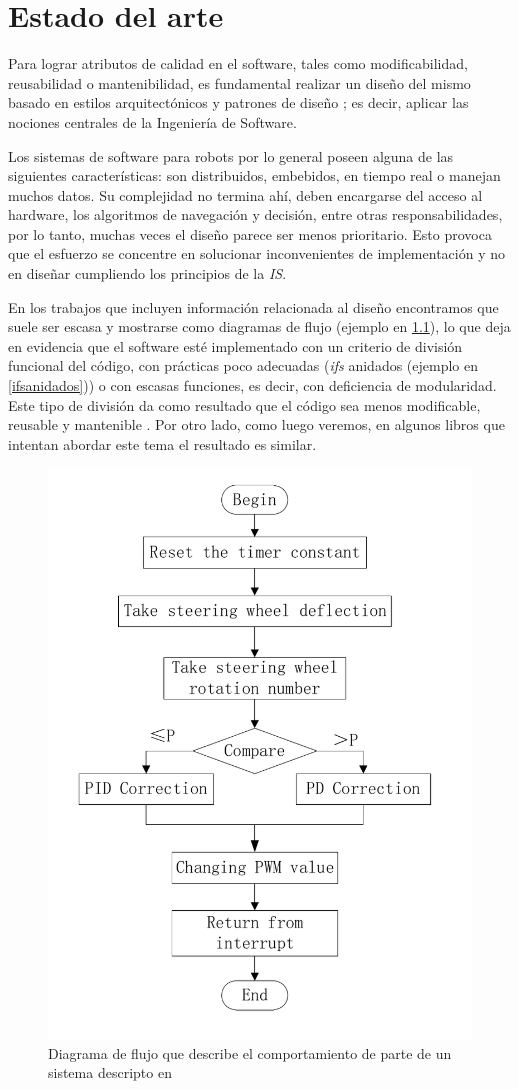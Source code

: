 \chapter{Estado del arte}


Para lograr atributos de calidad en el software, tales como modificabilidad, reusabilidad o mantenibilidad, es fundamental realizar un diseño del mismo basado en estilos arquitectónicos y patrones de diseño \cite{Gamma:1995:DPE:186897,shawgarlan,buschmann}; es decir, aplicar las nociones centrales de la Ingeniería de Software.

Los sistemas de software para robots por lo general poseen alguna de las siguientes características: son distribuidos, embebidos, en tiempo real o manejan muchos datos. Su complejidad no termina ahí, deben encargarse del acceso al hardware, los algoritmos de navegación y decisión, entre otras responsabilidades, por lo tanto, muchas veces el diseño parece ser menos prioritario. Esto provoca que el esfuerzo se concentre en solucionar inconvenientes de implementación y no en diseñar cumpliendo los principios de la \textit{IS}.

En los trabajos que incluyen información relacionada al diseño \cite{bad-desing-auto,bad-desing-implantable,code-1,code-2,Zhang2009,bad-design-uml,bad-design-robot} encontramos que suele ser escasa y mostrarse como diagramas de flujo (ejemplo en \ref{flujo}), lo que deja en evidencia que el software esté implementado con un criterio de división funcional del código, con prácticas poco adecuadas (\textit{ifs} anidados (ejemplo en \ref{ifsanidados})) o con escasas funciones, es decir, con deficiencia de modularidad. Este tipo de división da como resultado que el código sea menos modificable, reusable y mantenible \cite{parnas72}. Por otro lado, como luego veremos, en algunos libros que intentan abordar este tema \cite{douglass} el resultado es similar.

\begin{figure}[h]
	\label{flujo}
    \centering    
    \caption{Diagrama de flujo que describe el comportamiento de parte de un sistema descripto en \cite{bad-desing-auto}}
    \includegraphics[width=0.5\linewidth]{diagrama_de_flujo.png}
\end{figure}

